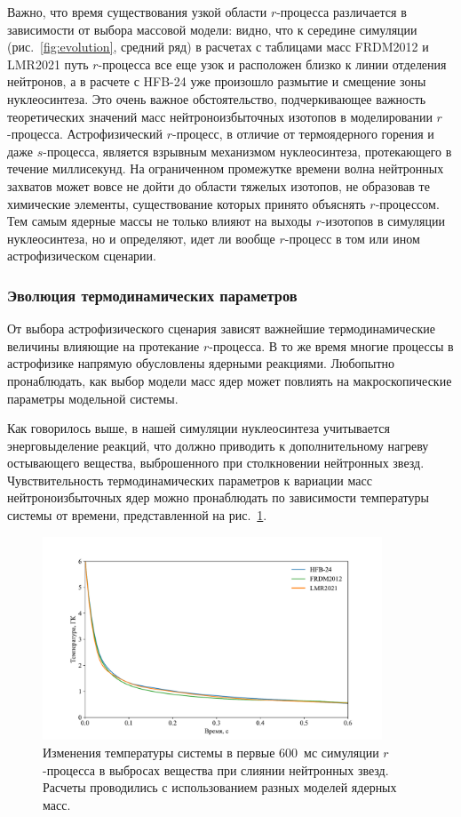 Важно, что время существования узкой области $r$-процесса различается в зависимости от выбора массовой модели: видно, что к середине симуляции (рис.~\ref{fig:evolution}, средний ряд) в расчетах с таблицами масс FRDM2012 и LMR2021 путь $r$-процесса все еще узок и расположен близко к линии отделения нейтронов, а в расчете с HFB-24 уже произошло размытие и смещение зоны нуклеосинтеза. Это очень важное обстоятельство, подчеркивающее важность теоретических значений масс нейтроноизбыточных изотопов в моделировании $r$-процесса. Астрофизический $r$-процесс, в отличие от термоядерного горения и даже $s$-процесса, является взрывным механизмом нуклеосинтеза, протекающего в течение миллисекунд. На ограниченном промежутке времени волна нейтронных захватов может вовсе не дойти до области тяжелых изотопов, не образовав те химические элементы, существование которых принято объяснять $r$-процессом. Тем самым ядерные массы не только влияют на выходы $r$-изотопов в симуляции нуклеосинтеза, но и определяют, идет ли вообще $r$-процесс в том или ином астрофизическом сценарии.

\subsubsection{Эволюция термодинамических параметров}
От выбора астрофизического сценария зависят важнейшие термодинамические величины влияющие на протекание $r$-процесса. В то же время многие процессы в астрофизике напрямую обусловлены ядерными реакциями. Любопытно пронаблюдать, как выбор модели масс ядер может повлиять на макроскопические параметры модельной системы.

Как говорилось выше, в нашей симуляции нуклеосинтеза учитывается энерговыделение реакций, что должно приводить к дополнительному нагреву остывающего вещества, выброшенного при столкновении нейтронных звезд. Чувствительность термодинамических параметров к вариации масс нейтроноизбыточных ядер можно пронаблюдать по зависимости температуры системы от времени, представленной на рис.~\ref{fig:temp}.

\begin{figure}
\centering
\includegraphics[width=0.9\textwidth]{../pics/temp.pdf}
\caption{Изменения температуры системы в первые 600~мс симуляции $r$-процесса в выбросах вещества при слиянии нейтронных звезд. Расчеты проводились с использованием разных моделей ядерных масс.}
\label{fig:temp}
\end{figure}

